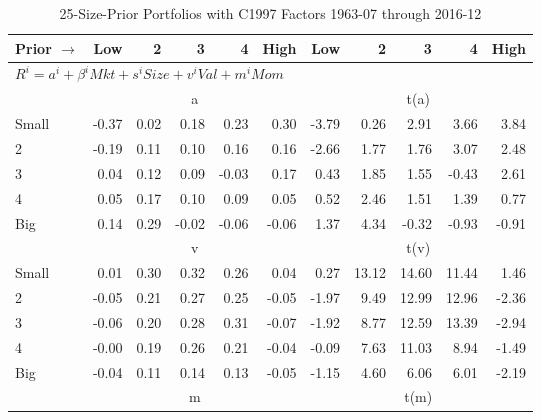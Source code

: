 
\begin{table}[!ht]
\centering
\caption{25-Size-Prior Portfolios with C1997 Factors 1963-07 through 2016-12}
\begin{tabular}{lrrrrrrrrrr}
  \toprule
    Prior $\rightarrow$ & Low & 2 & 3 & 4 & High & Low & 2 & 3 & 4 & High \\ 
  \midrule
  \multicolumn{11}{l}{$R^i=a^i+\beta^iMkt+s^iSize+v^iVal+m^iMom$} \\

  
    
      & \multicolumn{5}{c}{a} & \multicolumn{5}{c}{t(a)}
    
    \\
      \cmidrule(r){2-6} \cmidrule(r){7-11}

    Small   & -0.37  & 0.02  & 0.18  & 0.23  & 0.30  & -3.79  & 0.26  & 2.91  & 3.66  & 3.84  \\
         2  & -0.19  & 0.11  & 0.10  & 0.16  & 0.16  & -2.66  & 1.77  & 1.76  & 3.07  & 2.48  \\
         3  & 0.04  & 0.12  & 0.09  & -0.03  & 0.17  & 0.43  & 1.85  & 1.55  & -0.43  & 2.61  \\
         4  & 0.05  & 0.17  & 0.10  & 0.09  & 0.05  & 0.52  & 2.46  & 1.51  & 1.39  & 0.77  \\
    Big     & 0.14  & 0.29  & -0.02  & -0.06  & -0.06  & 1.37  & 4.34  & -0.32  & -0.93  & -0.91  \\

  
    
      & \multicolumn{5}{c}{v} & \multicolumn{5}{c}{t(v)}
    
    \\
      \cmidrule(r){2-6} \cmidrule(r){7-11}

    Small   & 0.01  & 0.30  & 0.32  & 0.26  & 0.04  & 0.27  & 13.12  & 14.60  & 11.44  & 1.46  \\
         2  & -0.05  & 0.21  & 0.27  & 0.25  & -0.05  & -1.97  & 9.49  & 12.99  & 12.96  & -2.36  \\
         3  & -0.06  & 0.20  & 0.28  & 0.31  & -0.07  & -1.92  & 8.77  & 12.59  & 13.39  & -2.94  \\
         4  & -0.00  & 0.19  & 0.26  & 0.21  & -0.04  & -0.09  & 7.63  & 11.03  & 8.94  & -1.49  \\
    Big     & -0.04  & 0.11  & 0.14  & 0.13  & -0.05  & -1.15  & 4.60  & 6.06  & 6.01  & -2.19  \\

  
    
      & \multicolumn{5}{c}{m} & \multicolumn{5}{c}{t(m)}
    

\end{tabular}
\end{table}
